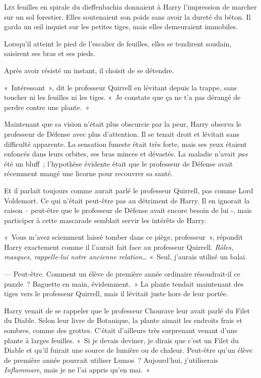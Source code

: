 
\lettrine{L}{es} feuilles en spirale du dieffenbachia donnaient à Harry l'impression de marcher sur un sol forestier. Elles soutenaient son poids sans avoir la dureté du béton. Il garda un œil inquiet sur les petites tiges, mais elles demeuraient immobiles.

Lorsqu'il atteint le pied de l'escalier de feuilles, elles se tendirent soudain, saisirent ses bras et ses pieds.

Après avoir résisté un instant, il choisit de se détendre.

«~Intéressant~», dit le professeur Quirrell en lévitant depuis la trappe, sans toucher ni les feuilles ni les tiges. «~Je constate que ça ne t'a pas dérangé de perdre contre une plante.~»

Maintenant que sa vision n'était plus obscurcie par la peur, Harry observa le professeur de Défense avec plus d'attention. Il se tenait droit et lévitait sans difficulté apparente. La sensation funeste était très forte, mais ses yeux étaient enfoncés dans leurs orbites, ses bras minces et dévastés. La maladie n'avait \emph{pas} été un bluff~; l'hypothèse évidente était que le professeur de Défense avait récemment mangé une licorne pour recouvrer sa santé.

Et il parlait toujours comme aurait parlé le professeur Quirrell, pas comme Lord Voldemort. Ce qui n'était peut-être pas au détriment de Harry. Il en ignorait la raison -- peut-être que le professeur de Défense avait encore besoin de lui -, mais participer à cette mascarade semblait servir les intérêts de Harry.

«~Vous m'avez sciemment laissé tomber dans ce piège, professeur~», répondit Harry exactement comme il l'aurait fait face au professeur Quirrell. \emph{Rôles, masques, rappelle-lui notre ancienne relation…} «~Seul, j'aurais utilisé un balai.

--- Peut-être. Comment un élève de première année ordinaire résoudrait-il ce puzzle~? Baguette en main, évidemment.~» La plante tendait maintenant des tiges vers le professeur Quirrell, mais il lévitait juste hors de leur portée.

Harry venait de se rappeler que le professeur Chourave leur avait parlé du Filet du Diable. Selon leur livre de Botanique, la plante aimait les endroits frais et sombres, comme des grottes. C'était d'ailleurs très surprenant venant d'une plante à larges feuilles. «~Si je devais deviner, je dirais que c'est un Filet du Diable et qu'il fuirait une source de lumière ou de chaleur. Peut-être qu'un élève de première année pourrait utiliser Lumos~? Aujourd'hui, j'utiliserais \emph{Inflammare}, mais je ne l'ai appris qu'en mai.~»

